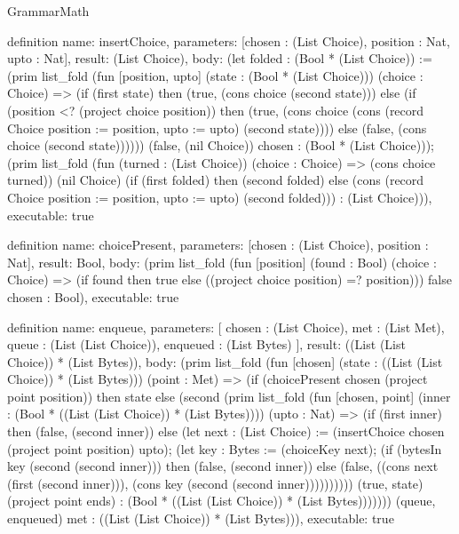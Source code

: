 \begin{lexlean}{GrammarMath}
\begin{semanticmodule}
{{{definition{
  name: insertChoice,
  parameters: [chosen : (List Choice), position : Nat, upto : Nat],
  result: (List Choice),
  body: (let folded : (Bool * (List Choice)) := (prim list_fold (fun [position, upto] (state : (Bool * (List Choice))) (choice : Choice) => (if (first state) then (true, (cons choice (second state))) else (if (position <? (project choice position)) then (true, (cons choice (cons (record Choice {position := position, upto := upto}) (second state)))) else (false, (cons choice (second state)))))) (false, (nil Choice)) chosen : (Bool * (List Choice))); (prim list_fold (fun (turned : (List Choice)) (choice : Choice) => (cons choice turned)) (nil Choice) (if (first folded) then (second folded) else (cons (record Choice {position := position, upto := upto}) (second folded))) : (List Choice))),
  executable: true
}

definition{
  name: choicePresent,
  parameters: [chosen : (List Choice), position : Nat],
  result: Bool,
  body: (prim list_fold (fun [position] (found : Bool) (choice : Choice) => (if found then true else ((project choice position) =? position))) false chosen : Bool),
  executable: true
}

definition{
  name: enqueue,
  parameters: [
    chosen : (List Choice),
    met : (List Met),
    queue : (List (List Choice)),
    enqueued : (List Bytes)
  ],
  result: ((List (List Choice)) * (List Bytes)),
  body: (prim list_fold (fun [chosen] (state : ((List (List Choice)) * (List Bytes))) (point : Met) => (if (choicePresent chosen (project point position)) then state else (second (prim list_fold (fun [chosen, point] (inner : (Bool * ((List (List Choice)) * (List Bytes)))) (upto : Nat) => (if (first inner) then (false, (second inner)) else (let next : (List Choice) := (insertChoice chosen (project point position) upto); (let key : Bytes := (choiceKey next); (if (bytesIn key (second (second inner))) then (false, (second inner)) else (false, ((cons next (first (second inner))), (cons key (second (second inner)))))))))) (true, state) (project point ends) : (Bool * ((List (List Choice)) * (List Bytes))))))) (queue, enqueued) met : ((List (List Choice)) * (List Bytes))),
  executable: true
}

}}}
\end{semanticmodule}
\end{lexlean}

